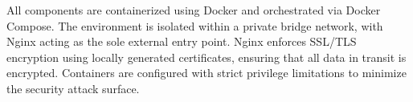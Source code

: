 All components are containerized using Docker and orchestrated via Docker
Compose. The environment is isolated within a private bridge network, with
Nginx acting as the sole external entry point. Nginx enforces SSL/TLS
encryption using locally generated certificates, ensuring that all data in
transit is encrypted. Containers are configured with strict privilege
limitations to minimize the security attack surface.